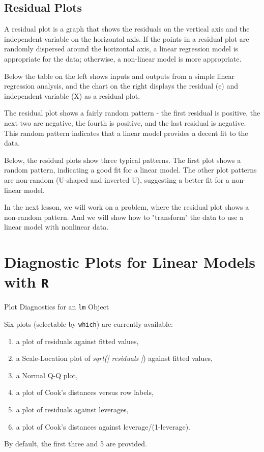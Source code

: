 \documentclass[Main.tex]{subfiles}
\begin{document}
\subsection{Residual Plots}
A residual plot is a graph that shows the residuals on the vertical axis and the independent variable on the horizontal axis. If the points in a residual plot are randomly dispersed around the horizontal axis, a linear regression model is appropriate for the data; otherwise, a non-linear model is more appropriate.

Below the table on the left shows inputs and outputs from a simple linear regression analysis, and the chart on the right displays the residual (e) and independent variable (X) as a residual plot.


The residual plot shows a fairly random pattern - the first residual is positive, the next two are negative, the fourth is positive, and the last residual is negative. This random pattern indicates that a linear model provides a decent fit to the data.

Below, the residual plots show three typical patterns. The first plot shows a random pattern, indicating a good fit for a linear model. The other plot patterns are non-random (U-shaped and inverted U), suggesting a better fit for a non-linear model.


In the next lesson, we will work on a problem, where the residual plot shows a non-random pattern. And we will show how to "transform" the data to use a linear model with nonlinear data.



\section{Diagnostic Plots for Linear Models with \texttt{R}}
Plot Diagnostics for an \texttt{lm} Object


Six plots (selectable by \texttt{which}) are currently available: 
\begin{enumerate}
	\item a plot of residuals against fitted values, 
	\item a Scale-Location plot of \textit{sqrt(| residuals |}) against fitted values, 
	\item a Normal Q-Q plot, 
	\item a plot of Cook's distances versus row labels, 
	\item a plot of residuals against leverages, 
	\item a plot of Cook's distances against leverage/(1-leverage).
\end{enumerate} By default, the first three and 5 are provided.
\end{document}
